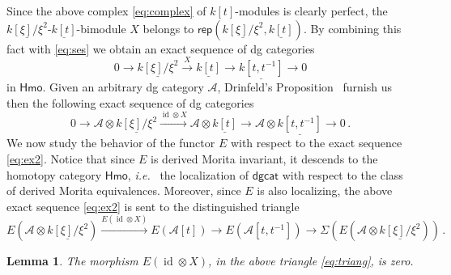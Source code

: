 \documentclass{amsart}
\numberwithin{equation}{subsection}
\newtheorem{lemma}[theorem]{Lemma}
\theoremstyle{remark}
\theoremstyle{remark}
\theoremstyle{remark}
\theoremstyle{remark}
\begin{document}
Since the above complex \eqref{eq:complex} of $k[t]$-modules is clearly perfect, the $\underline{k[\xi]/\xi^2}\text{-}\underline{k[t]}$-bimodule $X$ belongs to ${\mathsf{rep}}(\underline{k[\xi]/\xi^2}, \underline{k[t]})$. By combining this fact with \eqref{eq:ses} we obtain an exact sequence of dg categories
\begin{equation*}
0 {\longrightarrow} \underline{k[\xi]/\xi^2} \stackrel{X}{\longrightarrow} \underline{k[t]} {\longrightarrow} \underline{k[t,t^{-1}]} {\longrightarrow} 0
\end{equation*}
in ${\mathsf{Hmo}}$. Given an arbitrary dg category ${{\mathcal A}}$, Drinfeld's Proposition~\cite[Proposition~1.6.3]{Drinfeld} furnish us then the following exact sequence of dg categories
\begin{equation}\label{eq:ex2}
0 {\longrightarrow} {{\mathcal A}} \otimes \underline{k[\xi]/\xi^2} \stackrel{\operatorname{id} \otimes X}{\longrightarrow} {{\mathcal A}} \otimes \underline{k[t]} {\longrightarrow} {{\mathcal A}} \otimes \underline{k[t,t^{-1}]} {\longrightarrow} 0\,.
\end{equation}
We now study the behavior of the functor $E$ with respect to the exact sequence \eqref{eq:ex2}. Notice that since $E$ is derived Morita invariant, it descends to the homotopy category ${\mathsf{Hmo}}$, {\textsl{i.e.}\ } the localization of ${\mathsf{dgcat}}$ with respect to the class of derived Morita equivalences. Moreover, since $E$ is also localizing, the above exact sequence \eqref{eq:ex2} is sent to the distinguished triangle
\begin{equation}\label{eq:triang}
E({{\mathcal A}} \otimes \underline{k[\xi]/\xi^2}) \stackrel{E(\operatorname{id} \otimes X)}{\longrightarrow} E({{\mathcal A}}[t]) {\longrightarrow} E({{\mathcal A}}[t,t^{-1}])  {\longrightarrow} \Sigma(E({{\mathcal A}} \otimes \underline{k[\xi]/\xi^2})) \,.
\end{equation}
\begin{lemma}\label{lem:key2}
The morphism $E(\operatorname{id} \otimes X)$, in the above triangle \eqref{eq:triang}, is zero.
\end{lemma}
\end{document}
